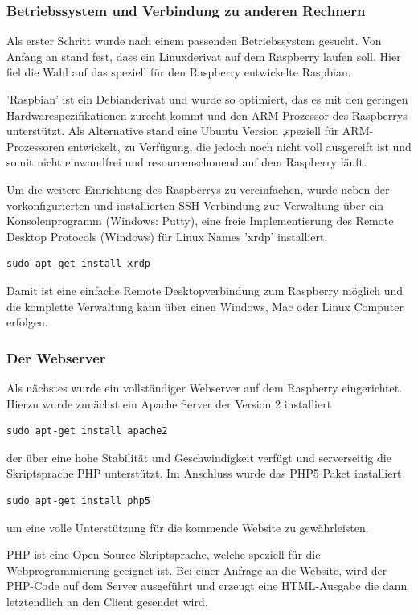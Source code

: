 \documentclass[11pt,a4paper]{article} %
\begin{document}
\subsubsection{Betriebssystem und Verbindung zu anderen Rechnern}
Als erster Schritt wurde nach einem passenden Betriebssystem gesucht. Von Anfang an stand fest, dass ein Linuxderivat auf dem Raspberry laufen soll. Hier fiel die Wahl auf das speziell für den Raspberry entwickelte Raspbian.
\par
'Raspbian' ist ein Debianderivat und wurde so optimiert, das es mit den geringen Hardwarespezifikationen zurecht kommt und den ARM-Prozessor des Raspberrys unterstützt. Als Alternative stand eine Ubuntu Version ,speziell für ARM-Prozessoren entwickelt, zu Verfügung, die jedoch noch nicht voll ausgereift ist und somit nicht einwandfrei und resourcenschonend auf dem Raspberry läuft.
\par
 Um die weitere Einrichtung des Raspberrys zu vereinfachen, wurde neben der vorkonfigurierten und installierten SSH Verbindung zur Verwaltung über ein Konsolenprogramm (Windows: Putty), eine freie Implementierung des Remote Desktop Protocols (Windows) für Linux Names 'xrdp' installiert. \cite{2}
\begin{frame}

\begin{lstlisting}
sudo apt-get install xrdp
\end{lstlisting}

\end{frame}
Damit ist eine einfache Remote Desktopverbindung zum Raspberry möglich und die komplette Verwaltung kann über einen Windows, Mac oder Linux Computer erfolgen. 
\par
\subsubsection{Der Webserver}
Als nächstes wurde ein vollständiger Webserver auf dem Raspberry eingerichtet. Hierzu wurde zunächst ein Apache Server der Version 2 installiert
\begin{frame}

\begin{lstlisting}
sudo apt-get install apache2
\end{lstlisting}

\end{frame}
 der über eine hohe Stabilität und Geschwindigkeit verfügt und serverseitig die Skriptsprache PHP unterstützt. Im Anschluss wurde das PHP5 Paket installiert
 \begin{frame}

\begin{lstlisting}
sudo apt-get install php5
\end{lstlisting}

\end{frame}
 um eine volle Unterstützung für die kommende Website zu gewährleisten.
 \par
 PHP ist eine Open Source-Skriptsprache, welche speziell für die Webprogrammierung geeignet ist. Bei einer Anfrage an die Website, wird der PHP-Code auf dem Server ausgeführt und erzeugt eine HTML-Ausgabe die dann letztendlich an den Client gesendet wird.
 \cite{3}
\par
\end{document}
